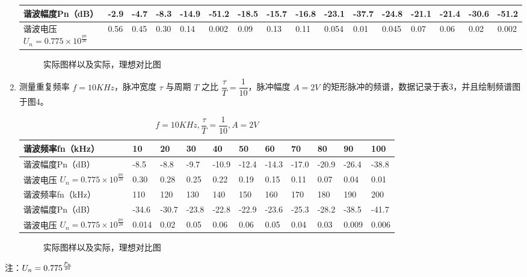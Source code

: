 \documentclass[dvipsnames, svgnames,a4paper,11pt]{article}
\begin{document}
\begin{enumerate}
\begin{table}[H]
\begin{tabularx}{\textwidth}{|p{}|p{1.48em}|p{1.48em}|p{1.48em}|X|X|X|X|X|X|X|X|X|X|X|X|}
			谐波幅度Pn（dB） & \small{-2.9} & \small{-4.7} & \small{-8.3} & \tiny{-14.9} & \tiny{-51.2} & \tiny{-18.5} & \tiny{-15.7} & \tiny{-16.8} & \tiny{-23.1} & \tiny{-37.7} & \tiny{-24.8} & \tiny{-21.1} & \tiny{-21.4} &\tiny{-30.6} & \tiny{-51.2}\\
			\hline
      谐波电压 $U_n = 0.775 \times 10^{\frac{pn}{20}}$ & 0.56 & 0.45 & 0.30 & 0.14 & 0.002 & 0.09 & 0.13 & 0.11 & 0.054 & 0.01 & 0.045 & 0.07 & 0.06 & 0.02 & 0.002 \\
			\hline
		\end{tabularx}
	\end{table}
  \begin{figure}[htbp]
    \centering
    \caption{实际图样以及实际，理想对比图}
  \end{figure}
  \item 测量重复频率 $f = 10KHz$，脉冲宽度 $\tau$ 与周期 $T$ 之比 $\dfrac{\tau}{T} = \dfrac{1}{10}$，脉冲幅度 $A = 2V$ 的矩形脉冲的频谱，数据记录于表3，并且绘制频谱图于图4。
  \begin{table}
		\renewcommand\arraystretch{1.7}
		\centering
		\caption{$f = 10KHz, \dfrac{\tau}{T} = \dfrac{1}{10}, A = 2V$}
		\begin{tabularx}{\textwidth}{|p{}|X|X|X|X|X|X|X|X|X|X|}
			\hline
			谐波频率fn（kHz） & 10 & 20 & 30 & 40 & 50 & 60 & 70 & 80 & 90 & 100 \\
			\hline
			谐波幅度Pn（dB） & -8.5 & -8.8 & -9.7 & -10.9 & -12.4 & -14.3 & -17.0 & -20.9 & -26.4 & -38.8 \\
			\hline
      谐波电压 $U_n = 0.775 \times 10^{\frac{pn}{20}}$ & 0.30 & 0.28 & 0.25 & 0.22 & 0.19 & 0.15 & 0.11 & 0.07 & 0.04 & 0.01 \\
			\hline
      谐波频率fn（kHz） & 110 & 120 & 130 & 140 & 150 & 160 & 170 & 180 & 190 & 200 \\
			\hline
			谐波幅度Pn（dB） & -34.6 & -30.7 & -23.8 & -22.8 & -22.9 & -23.6 & -25.3 & -28.2 & -38.5 & -41.7 \\
			\hline
      谐波电压 $U_n = 0.775 \times 10^{\frac{pn}{20}}$ & 0.014 & 0.02 & 0.05 & 0.06 & 0.06 & 0.05 & 0.04 & 0.03 & 0.009 & 0.006 \\
			\hline
		\end{tabularx}
	\end{table}
  \begin{figure}[htbp]
    \centering
    \caption{实际图样以及实际，理想对比图}
  \end{figure}
\end{enumerate}
注：$U_n = 0.775 \time 10^{\frac{P_n}{20}}$
\end{document}
